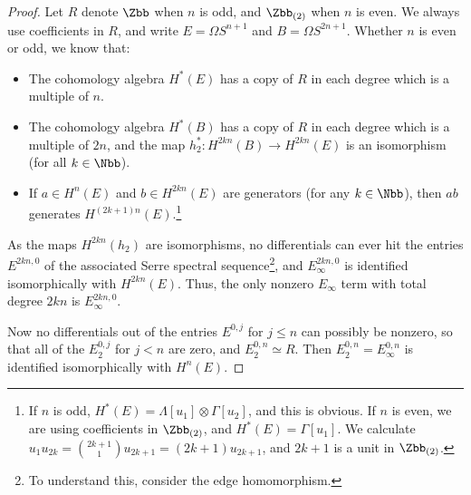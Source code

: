 \begin{proof}
Let $R$ denote $\Zbb$ when $n$ is odd, and $\Zbb_{(2)}$ when $n$ is even. We always use coefficients in $R$, and write $E=\Omega S^{n+1}$ and $B=\Omega S^{2n+1}$. Whether $n$ is even or odd, we know that:
\begin{itemize}
\item The cohomology algebra $H^*(E)$ has a copy of $R$ in each degree which is a multiple of $n$.
\item The cohomology algebra $H^*(B)$ has a copy of $R$ in each degree which is a multiple of $2n$, and the map $h_2^*:H^{2kn}(B)\to H^{2kn}(E)$ is an isomorphism (for all $k\in\Nbb$).
\item If $a\in H^{n}(E)$ and $b\in H^{2kn}(E)$ are generators (for any $k\in\Nbb$), then $ab$ generates $H^{(2k+1)n}(E)$.\footnote{If $n$ is odd, $H^*(E)=\Lambda[u_1]\otimes \Gamma[u_2]$, and this is obvious. If $n$ is even, we are using coefficients in $\Zbb_{(2)}$, and $H^*(E)=\Gamma[u_1]$. We calculate $u_1u_{2k}=\binom{2k+1}{1}u_{2k+1}=(2k+1)u_{2k+1}$, and $2k+1$ is a unit in $\Zbb_{(2)}$.}
\end{itemize}

As the maps $H^{2kn}(h_2)$ are isomorphisms, no differentials can ever hit the entries $E^{2kn,0}$ of the associated Serre spectral sequence\footnote{To understand this, consider the edge homomorphism.}, and $E^{2kn,0}_\infty$ is identified isomorphically with $H^{2kn}(E)$.
Thus, the only nonzero $E_\infty$ term with total degree $2kn$ is $E_\infty^{2kn,0}$.

Now no differentials out of the entries $E^{0,j}$ for $j\leq n$ can possibly be nonzero, so that all of the $E_2^{0,j}$ for $j<n$ are zero, and $E_2^{0,n}\simeq R$. Then $E_2^{0,n}=E_\infty^{0,n}$ is identified isomorphically with $H^n(E)$.


\end{proof}
